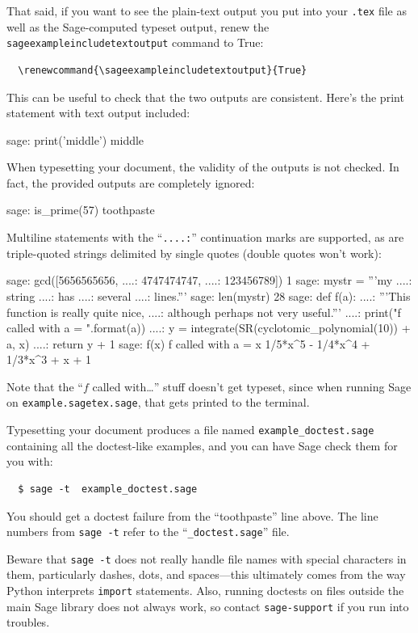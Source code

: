 \documentclass{article}
\begin{document}
That said, if you want to see the plain-text output you put into your
\verb|.tex| file as well as the Sage-computed typeset output, renew the
\texttt{sageexampleincludetextoutput} command to True:
\begin{verbatim}
  \renewcommand{\sageexampleincludetextoutput}{True}
\end{verbatim}
\renewcommand{\sageexampleincludetextoutput}{True}
This can be useful to check that the two outputs are consistent. Here's
the print statement with text output included:
\begin{sageexample}
  sage: print('middle')
  middle
\end{sageexample}
When typesetting your document, the validity of the outputs is not
checked. In fact, the provided outputs are completely ignored:
\renewcommand{\sageexampleincludetextoutput}{True}
\begin{sageexample}
  sage: is_prime(57)
  toothpaste
\end{sageexample}
\renewcommand{\sageexampleincludetextoutput}{False}%
Multiline statements with the ``\verb|....:|'' continuation marks are
supported, as are triple-quoted strings delimited by single quotes
(double quotes won't work):
\begin{sageexample}
  sage: gcd([5656565656,
  ....:      4747474747,
  ....:      123456789])
  1
  sage: mystr = '''my
  ....: string
  ....: has
  ....: several
  ....: lines.'''
  sage: len(mystr)
  28
  sage: def f(a):
  ....:     '''This function is really quite nice,
  ....:     although perhaps not very useful.'''
  ....:     print("f called with a = {}".format(a))
  ....:     y = integrate(SR(cyclotomic_polynomial(10)) + a, x)
  ....:     return y + 1
  sage: f(x)
  f called with a =  x
  1/5*x^5 - 1/4*x^4 + 1/3*x^3 + x + 1
\end{sageexample}
Note that the ``$f$ called with\ldots'' stuff doesn't get typeset, since
when running Sage on \texttt{example.sagetex.sage}, that gets printed to the
terminal.

Typesetting your document produces a file named
\texttt{example\_doctest.sage} containing all the doctest-like examples,
and you can have Sage check them for you with:
\begin{verbatim}
  $ sage -t  example_doctest.sage
\end{verbatim}
You should get a doctest failure from the ``toothpaste'' line above. The
line numbers from \texttt{sage -t} refer to the ``\verb|_doctest.sage|''
file.

Beware that \texttt{sage -t} does not really handle file names with
special characters in them, particularly dashes, dots, and spaces---this
ultimately comes from the way Python interprets \texttt{import}
statements. Also, running doctests on files outside the main Sage
library does not always work, so contact \texttt{sage-support} if you
run into troubles.
\end{document}

